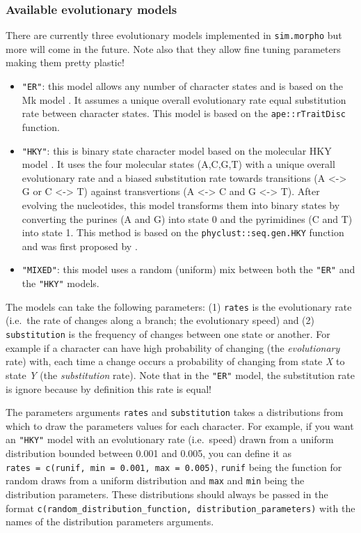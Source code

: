 \documentclass[]{book}
\providecommand{\tightlist}{%
  \setlength{\itemsep}{0pt}\setlength{\parskip}{0pt}}
\theoremstyle{definition}
\theoremstyle{definition}
\theoremstyle{remark}
\begin{document}
\subsubsection{Available evolutionary
models}\label{available-evolutionary-models}

There are currently three evolutionary models implemented in
\texttt{sim.morpho} but more will come in the future. Note also that
they allow fine tuning parameters making them pretty plastic!

\begin{itemize}
\tightlist
\item
  \texttt{"ER"}: this model allows any number of character states and is
  based on the Mk model \citep{lewisa2001}. It assumes a unique overall
  evolutionary rate equal substitution rate between character states.
  This model is based on the \texttt{ape::rTraitDisc} function.
\item
  \texttt{"HKY"}: this is binary state character model based on the
  molecular HKY model \citep{HKY85}. It uses the four molecular states
  (A,C,G,T) with a unique overall evolutionary rate and a biased
  substitution rate towards transitions (A \textless{}-\textgreater{} G
  or C \textless{}-\textgreater{} T) against transvertions (A
  \textless{}-\textgreater{} C and G \textless{}-\textgreater{} T).
  After evolving the nucleotides, this model transforms them into binary
  states by converting the purines (A and G) into state 0 and the
  pyrimidines (C and T) into state 1. This method is based on the
  \texttt{phyclust::seq.gen.HKY} function and was first proposed by
  \citet{OReilly2016}.
\item
  \texttt{"MIXED"}: this model uses a random (uniform) mix between both
  the \texttt{"ER"} and the \texttt{"HKY"} models.
\end{itemize}

The models can take the following parameters: (1) \texttt{rates} is the
evolutionary rate (i.e.~the rate of changes along a branch; the
evolutionary speed) and (2) \texttt{substitution} is the frequency of
changes between one state or another. For example if a character can
have high probability of changing (the \emph{evolutionary} rate) with,
each time a change occurs a probability of changing from state \emph{X}
to state \emph{Y} (the \emph{substitution} rate). Note that in the
\texttt{"ER"} model, the substitution rate is ignore because by
definition this rate is equal!

The parameters arguments \texttt{rates} and \texttt{substitution} takes
a distributions from which to draw the parameters values for each
character. For example, if you want an \texttt{"HKY"} model with an
evolutionary rate (i.e.~speed) drawn from a uniform distribution bounded
between 0.001 and 0.005, you can define it as
\texttt{rates\ =\ c(runif,\ min\ =\ 0.001,\ max\ =\ 0.005)},
\texttt{runif} being the function for random draws from a uniform
distribution and \texttt{max} and \texttt{min} being the distribution
parameters. These distributions should always be passed in the format
\texttt{c(random\_distribution\_function,\ distribution\_parameters)}
with the names of the distribution parameters arguments.
\end{document}
